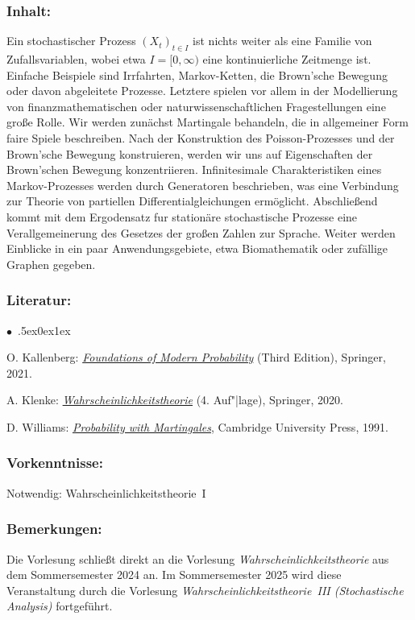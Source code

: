 \documentclass[a4paper,10pt]{article}
\renewenvironment{itemize}{\begin{list}{$\bullet$\ }{\itemsep.5ex\setlength{\topsep}{0.5\itemsep}\parsep0ex\labelsep1ex\settowidth{\labelwidth}{$\bullet$\ }\setlength{\leftmargin}{\labelwidth}\addtolength{\leftmargin}{3ex}\addtolength{\leftmargin}{\labelsep}}}{\end{list}}
\begin{document}
\subsubsection*{\large
    Inhalt:
}
Ein stochastischer Prozess $(X_t)_{t\in I}$ ist nichts weiter als eine Familie von Zufallsvariablen, wobei etwa $I = [0,\infty)$ eine kontinuierliche Zeitmenge ist. Einfache Beispiele sind Irrfahrten, Markov-Ketten, die Brown’sche Bewegung oder davon abgeleitete Prozesse. Letztere spielen vor allem in der Modellierung von finanzmathematischen oder naturwissenschaftlichen Fragestellungen eine große Rolle. Wir werden zunächst Martingale behandeln, die in allgemeiner Form faire Spiele beschreiben. Nach der Konstruktion des Poisson-Prozesses und der Brown’sche Bewegung konstruieren, werden wir uns auf Eigenschaften der Brown'schen Bewegung konzentriieren. Infinitesimale Charakteristiken eines Markov-Prozesses werden durch Generatoren beschrieben, was eine Verbindung zur Theorie von partiellen Differentialgleichungen ermöglicht. Abschließend kommt mit dem Ergodensatz fur stationäre stochastische Prozesse eine Verallgemeinerung des Gesetzes der großen Zahlen zur Sprache. Weiter werden Einblicke in ein paar Anwendungsgebiete, etwa Biomathematik oder zufällige Graphen gegeben. 
\subsubsection*{\large
    Literatur:
}
\begin{itemize}
\item
 O. Kallenberg: \href{https://link.springer.com/book/10.1007/978-3-030-61871-1}{\emph{Foundations of Modern Probability}} (Third Edition), Springer, 2021.
\item
 A. Klenke: \href{https://link.springer.com/book/10.1007/978-3-662-62089-2}{\emph{Wahrscheinlichkeitstheorie}} (4. Auf"|lage), Springer, 2020. 
\item 
D. Williams: \href{https://edisciplinas.usp.br/pluginfile.php/343758/mod_folder/content/0/Probability With Martingales(Williams).pdf}{\emph{Probability with Martingales}}, Cambridge University Press, 1991. 
\end{itemize}
\subsubsection*{\large
    Vorkenntnisse:
}
Notwendig: Wahrscheinlichkeitstheorie~I
\subsubsection*{\large
    Bemerkungen:
}
Die Vorlesung schließt direkt an die Vorlesung {\em Wahrscheinlichkeitstheorie} aus dem Sommersemester 2024 an. Im Sommersemester 2025 wird diese Veranstaltung durch die Vorlesung {\em Wahrscheinlichkeitstheorie~III (Stochastische Analysis)} fortgeführt.
\cleardoublepage
\end{document}
